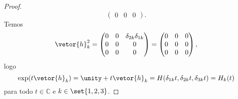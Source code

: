 \begin{proof}
\begin{equation*}
\begin{pmatrix}
            0 & 0 & 0
        \end{pmatrix}.
    \end{equation*}
    Temos
    \begin{equation*}
        \vetor{h}_k^2 = \begin{pmatrix}
            0 & 0 & \delta_{2k}\delta_{1k}\\
            0 & 0 & 0\\
            0 & 0 & 0
        \end{pmatrix} = \begin{pmatrix}
            0 & 0 & 0\\
            0 & 0 & 0\\
            0 & 0 & 0
        \end{pmatrix},
    \end{equation*}
    logo
    \begin{equation*}
        \exp(t \vetor{h}_k) = \unity + t \vetor{h}_k = H(\delta_{1k}t, \delta_{2k}t, \delta_{3k}t) = H_k(t)
    \end{equation*}
    para todo \(t \in \mathbb{C}\) e \(k \in \set{1,2,3}\).
\end{proof}


